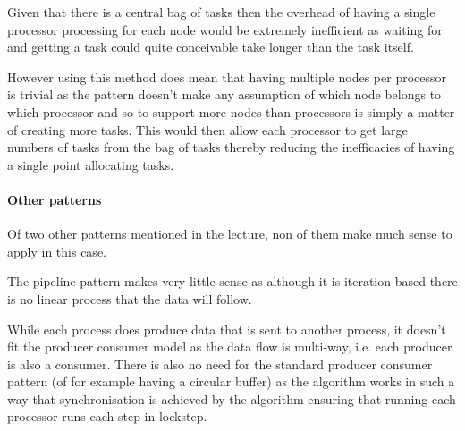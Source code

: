 \documentclass[11pt,a4paper]{article}
\begin{document}
Given that there is a central bag of tasks then the overhead of having a single
processor processing for each node would be extremely inefficient as waiting for
and getting a task could quite conceivable take longer than the task itself.

However using this method does mean that having multiple nodes per processor is trivial as the pattern doesn't make any assumption of which node belongs to which processor and so to support more nodes than processors is simply a matter of creating more tasks. This would then allow each processor to get large numbers of tasks from the bag of tasks thereby reducing the inefficacies of having a single point allocating tasks.

%


\paragraph{Other patterns}
Of two other patterns mentioned in the lecture, non of them make much sense to apply in this case.

The pipeline pattern makes very little sense as although it is iteration based there is no linear process that the data will follow.

While each process does produce data that is sent to another process, it doesn't fit the producer consumer model as the data flow is multi-way, i.e. each producer is also a consumer. There is also no need for the standard producer consumer pattern (of for example having a circular buffer) as the algorithm works in such a way that synchronisation is achieved by the algorithm ensuring that running each processor runs each step in lockstep.
\end{document}
